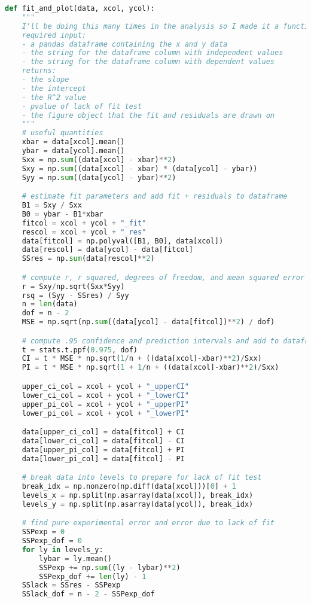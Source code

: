 \documentclass[12pt, letterpaper]{article}
\begin{document}
\begin{lstlisting}[language=python, caption=Python function to compute fit parameters and perform lack of fit test; also computes 0.95 confidence and prediction intervals, label={lst:fit}]
def fit_and_plot(data, xcol, ycol):
    """
    I'll be doing this many times in the analysis so I made it a function
    required input:
    - a pandas dataframe containing the x and y data
    - the string for the dataframe column with independent values
    - the string for the dataframe column with dependent values
    returns:
    - the slope
    - the intercept
    - the R^2 value
    - pvalue of lack of fit test
    - the figure object that the fit and residuals are drawn on
    """
    # useful quantities
    xbar = data[xcol].mean()
    ybar = data[ycol].mean()
    Sxx = np.sum((data[xcol] - xbar)**2)
    Sxy = np.sum((data[xcol] - xbar) * (data[ycol] - ybar))
    Syy = np.sum((data[ycol] - ybar)**2)

    # estimate fit parameters and add fit + residuals to dataframe
    B1 = Sxy / Sxx
    B0 = ybar - B1*xbar
    fitcol = xcol + ycol + "_fit"
    rescol = xcol + ycol + "_res"
    data[fitcol] = np.polyval([B1, B0], data[xcol])
    data[rescol] = data[ycol] - data[fitcol]
    SSres = np.sum(data[rescol]**2)

    # compute r, r squared, degrees of freedom, and mean squared error
    r = Sxy/np.sqrt(Sxx*Syy)
    rsq = (Syy - SSres) / Syy
    n = len(data)
    dof = n - 2
    MSE = np.sqrt(np.sum((data[ycol] - data[fitcol])**2) / dof)

    # compute .95 confidence and prediction intervals and add to dataframe
    t = stats.t.ppf(0.975, dof)
    CI = t * MSE * np.sqrt(1/n + ((data[xcol]-xbar)**2)/Sxx)
    PI = t * MSE * np.sqrt(1 + 1/n + ((data[xcol]-xbar)**2)/Sxx)

    upper_ci_col = xcol + ycol + "_upperCI"
    lower_ci_col = xcol + ycol + "_lowerCI"
    upper_pi_col = xcol + ycol + "_upperPI"
    lower_pi_col = xcol + ycol + "_lowerPI"

    data[upper_ci_col] = data[fitcol] + CI
    data[lower_ci_col] = data[fitcol] - CI
    data[upper_pi_col] = data[fitcol] + PI
    data[lower_pi_col] = data[fitcol] - PI

    # break data into levels to prepare for lack of fit test
    break_idx = np.nonzero(np.diff(data[xcol]))[0] + 1
    levels_x = np.split(np.asarray(data[xcol]), break_idx)
    levels_y = np.split(np.asarray(data[ycol]), break_idx)

    # find pure experimental error and error due to lack of fit
    SSPexp = 0
    SSPexp_dof = 0
    for ly in levels_y:
        lybar = ly.mean()
        SSPexp += np.sum((ly - lybar)**2)
        SSPexp_dof += len(ly) - 1
    SSlack = SSres - SSPexp
    SSlack_dof = n - 2 - SSPexp_dof


\end{lstlisting}
\end{document}
